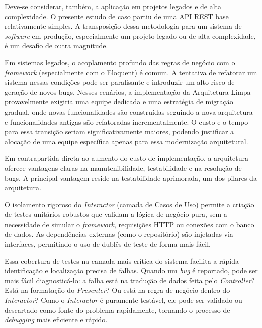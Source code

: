     \par Deve-se considerar, também, a aplicação em projetos legados e de alta complexidade. O presente estudo de caso partiu de uma API REST base relativamente simples. A transposição dessa metodologia para um sistema de \textit{software} em produção, especialmente um projeto legado ou de alta complexidade, é um desafio de outra magnitude.
    
    \par Em sistemas legados, o acoplamento profundo das regras de negócio com o \textit{framework} (especialmente com o Eloquent) é comum. A tentativa de refatorar um sistema nessas condições pode ser paralisante e introduzir um alto risco de geração de novos bugs. Nesses cenários, a implementação da Arquitetura Limpa provavelmente exigiria uma equipe dedicada e uma estratégia de migração gradual, onde novas funcionalidades são construídas seguindo a nova arquitetura e funcionalidades antigas são refatoradas incrementalmente. O custo e o tempo para essa transição seriam significativamente maiores, podendo justificar a alocação de uma equipe específica apenas para essa modernização arquitetural.
    
    \par Em contrapartida direta ao aumento do custo de implementação, a arquitetura oferece vantagens claras na manutenibilidade, testabilidade e na resolução de bugs. A principal vantagem reside na testabilidade aprimorada, um dos pilares da arquitetura.
    
    \par O isolamento rigoroso do \textit{Interactor} (camada de Casos de Uso) permite a criação de testes unitários robustos que validam a lógica de negócio pura, sem a necessidade de simular o \textit{framework}, requisições HTTP ou conexões com o banco de dados. As dependências externas (como o repositório) são injetadas via interfaces, permitindo o uso de dublês de teste de forma mais fácil.
    
    \par Essa cobertura de testes na camada mais crítica do sistema facilita a rápida identificação e localização precisa de falhas. Quando um \textit{bug} é reportado, pode ser mais fácil diagnosticá-lo: a falha está na tradução de dados feita pelo \textit{Controller}? Está na formatação do \textit{Presenter}? Ou está na regra de negócio dentro do \textit{Interactor}? Como o \textit{Interactor} é puramente testável, ele pode ser validado ou descartado como fonte do problema rapidamente, tornando o processo de \textit{debugging} mais eficiente e rápido.

